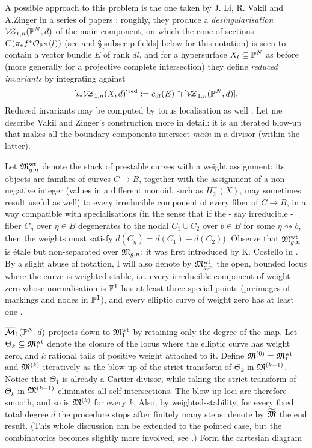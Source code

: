 A possible approach to this problem is the one taken by J. Li, R. Vakil and A.Zinger in a series of papers \cites{zsharp,zstructure,redgone,LZ,lz2,zingerstvsred,VZpreview,VZ}: roughly, they produce a \emph{desingularisation} $\mathcal{V\!Z}_{1,n}(\mathbb P^N,d)$ of the main component, on which the cone of sections $C(\pi_*f^*\mathcal{O}_{\mathbb P^N}(l))$ (see \cite{CL-pfields} and \S \ref{subsec:p-fields} below for this notation) is seen to contain a vector bundle $E$ of rank $dl$, and for a hypersurface $X_l\subseteq \mathbb P^N$ as before (more generally for a projective complete intersection) they define \emph{reduced invariants} by integrating against
\[[\iota_* \mathcal{V\!Z}_{1,n}(X,d)]^{\operatorname{red}}:= c_{dl}(E)\cap [\mathcal{V\!Z}_{1,n}(\mathbb P^N,d)].\]
Reduced invariants may be computed by torus localisation as well \cite{Zinger-CYhyp,APopa}. Let me describe Vakil and Zinger's construction more in detail: it is an iterated blow-up that makes all the boundary components intersect \emph{main} in a divisor (within the latter).
\begin{definition}\label{def:Costello}
 Let $\mathfrak M_{g,n}^{\rm{wt}}$ denote the stack of prestable curves with a weight assignment: its objects are families of curves $C\to B$, together with the assignment of a non-negative integer (values in a different monoid, such as $H_2^+(X)$, may sometimes result useful as well) to every irreducible component of every fiber of $C\to B$, in a way compatible with specialisations (in the sense that if the - say irreducible - fiber $C_\eta$ over $\eta\in B$ degenerates to the nodal $C_1\cup C_2$ over $b\in B$ for some $\eta\rightsquigarrow b$, then the weights must satisfy $d(C_\eta)=d(C_1)+d(C_2)$). Observe that $\mathfrak M_{g,n}^{\rm{wt}}$ is \'etale but non-separated over $\mathfrak M_{g,n}$; it was first introduced by K. Costello in \cite{Costello}. By a slight abuse of notation, I will also denote by $\mathfrak M_{g,n}^{\rm{wt}}$ the open, bounded locus where the curve is weighted-stable, i.e. every irreducible component of weight zero whose normalisation is $\mathbb P^1$ has at least three special points (preimages of markings and nodes in $\mathbb P^1$), and every elliptic curve of weight zero has at least one .
\end{definition}
 $\overline{\mathcal{M}}_1(\mathbb P^N,d)$ projects down to $\mathfrak M_1^{\textrm{wt}}$ by retaining only the degree of the map. Let $\Theta_k\subseteq \mathfrak M_1^{\textrm{wt}}$ denote the closure of the locus where the elliptic curve has weight zero, and $k$ rational tails of positive weight attached to it. Define $\mathfrak M^{(0)}=\mathfrak M_1^{\textrm{wt}}$ and $\mathfrak M^{(k)}$ iteratively as the blow-up of the strict transform of $\Theta_k$ in $\mathfrak M^{(k-1)}$. Notice that $\Theta_1$ is already a Cartier divisor, while taking the strict transform of $\Theta_k$ in $\mathfrak M^{(k-1)}$ eliminates all self-intersections. The blow-up loci are therefore smooth, and so is $\mathfrak M^{(k)}$ for every $k$. Also, by weighted-stability, for every fixed total degree $d$ the procedure stops after finitely many steps: denote by $\widetilde{\mathfrak M}$ the end result. (This whole discussion can be extended to the pointed case, but the combinatorics becomes slightly more involved, see \cite[\S 2]{VZ}.) Form the cartesian diagram
